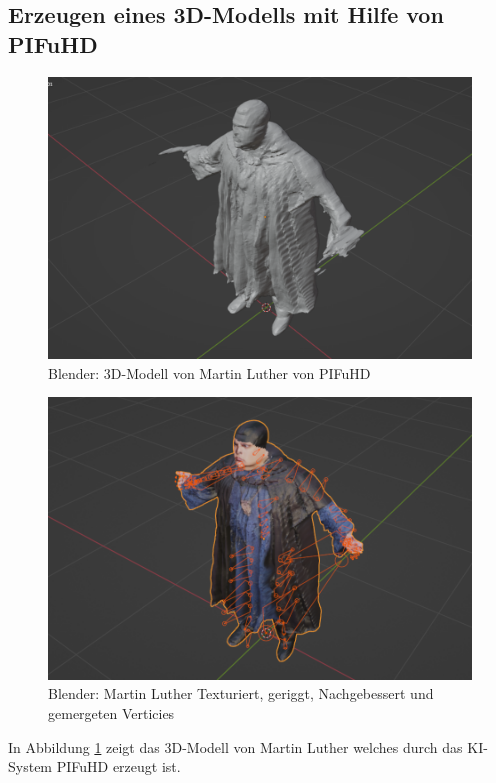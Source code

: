 \newpage
\subsection{Erzeugen eines 3D-Modells mit Hilfe von PIFuHD}
\begin{figure}
	\centering
	\includegraphics[width=14cm]{BilderFuerBA/BlenderMLVonPIFuHD105k.png}
	\caption{Blender: 3D-Modell von Martin Luther von PIFuHD}
	\label{BlenderMLVonPIFuHD105k}
\end{figure}
\begin{figure}
	\centering
	\includegraphics[width=14cm]{BilderFuerBA/BlenderMLGeriggtUndTexturiert95k.png}
	\caption{Blender: Martin Luther Texturiert, geriggt, Nachgebessert und gemergeten Verticies}
	\label{BlenderMLGeriggtUndTexturiert95k}
\end{figure}
In Abbildung \ref{BlenderMLVonPIFuHD105k} zeigt das 3D-Modell von Martin Luther welches durch das KI-System PIFuHD erzeugt ist.
